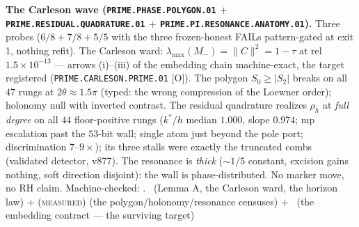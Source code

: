 \par\smallskip\noindent\textbf{The Carleson wave
(\texttt{PRIME.PHASE.POLYGON.01} $+$
\texttt{PRIME.RESIDUAL.\allowbreak QUADRATURE.01} $+$
\texttt{PRIME.PI.RESONANCE.\allowbreak ANATOMY.01}).}
Three probes ($6/8 + 7/8 + 5/5$ with the three frozen-honest
FAILs pattern-gated at exit 1, nothing refit).  The Carleson
ward: $\lambda_{\max}(M_-) = \|C\|^2 = 1 - \tau$ at rel
$1.5\times10^{-13}$ --- arrows (i)--(iii) of the embedding chain
machine-exact, the target registered
(\texttt{PRIME.CARLESON.PRIME.01} [O]).  The polygon $S_0 \ge
|S_2|$ breaks on all $47$ rungs at $2\theta \approx 1.5\pi$
(typed: the wrong compression of the Loewner order); holonomy
null with inverted contrast.  The residual quadrature realizes
$\rho_h$ at \emph{full degree} on all $44$ floor-positive rungs
($k^*/h$ median $1.000$, slope $0.974$; mp escalation past the
$53$-bit wall; single atom just beyond the pole port;
discrimination $7$--$9\times$); its three stalls were exactly
the truncated combs (validated detector, v877).  The resonance
is \emph{thick} ($\sim 1/5$ constant, excision gains nothing,
soft direction disjoint): the wall is phase-distributed.  No
marker move, no RH claim.
Machine-checked: .
\mE\ (Lemma A, the Carleson ward, the horizon law) $+$
(\textsc{measured}) (the polygon/holonomy/resonance censuses)
$+$ \mO\ (the embedding contract --- the surviving target)
\par\smallskip



